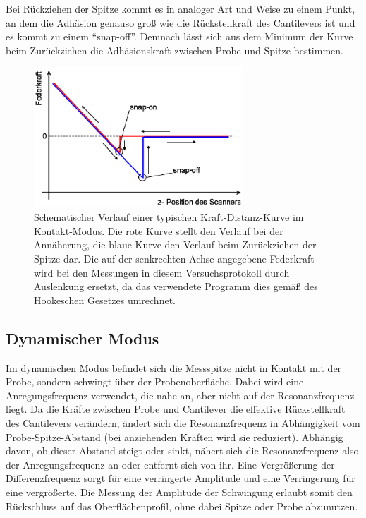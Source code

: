 \documentclass[
	a4paper,
	12pt,
	pagesize,
	ngerman
]{scrartcl}
\begin{document}
	Bei Rückziehen der Spitze kommt es in analoger Art und Weise zu einem Punkt, an dem die Adhäsion genauso groß wie die Rückstellkraft des Cantilevers ist und es kommt zu einem \enquote{snap-off}.
	Demnach lässt sich aus dem Minimum der Kurve beim Zurückziehen die Adhäsionskraft zwischen Probe und Spitze bestimmen.

	\begin{figure}[H]
		\includegraphics[width=0.7\textwidth]{images/sonstiges/KDS}
		\centering
		\caption{Schematischer Verlauf einer typischen Kraft-Distanz-Kurve im Kontakt-Modus. Die rote Kurve stellt den Verlauf bei der Annäherung, die blaue Kurve den Verlauf beim Zurückziehen der Spitze dar. Die auf der senkrechten Achse angegebene Federkraft wird bei den Messungen in diesem Versuchsprotokoll durch Auslenkung ersetzt, da das verwendete Programm dies gemäß des Hookeschen Gesetzes umrechnet. \cite{Anleitung}}
		\label{fig_KDS}
		\centering
	\end{figure}

	\subsection{Dynamischer Modus}
	Im dynamischen Modus befindet sich die Messspitze nicht in Kontakt mit der Probe, sondern schwingt über der Probenoberfläche.
	Dabei wird eine Anregungsfrequenz verwendet, die nahe an, aber nicht auf der Resonanzfrequenz liegt.
	Da die Kräfte zwischen Probe und Cantilever die effektive Rückstellkraft des Cantilevers verändern, ändert sich die Resonanzfrequenz in Abhängigkeit vom Probe-Spitze-Abstand (bei anziehenden Kräften wird sie reduziert).
	Abhängig davon, ob dieser Abstand steigt oder sinkt, nähert sich die Resonanzfrequenz also der Anregungsfrequenz an oder entfernt sich von ihr.
	Eine Vergrößerung der Differenzfrequenz sorgt für eine verringerte Amplitude und eine Verringerung für eine vergrößerte.
	Die Messung der Amplitude der Schwingung erlaubt somit den Rückschluss auf das Oberflächenprofil, ohne dabei Spitze oder Probe abzunutzen.
\end{document}
